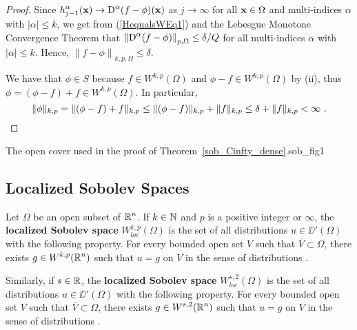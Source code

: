 \begin{proof}
Since
$\displaystyle
h^\alpha_{j-1}(\mathbf{x}) \to \operatorname{D}^\alpha (f-\phi)(\mathbf{x})$
as $j \to \infty$ for all $\mathbf{x} \in \Omega$ and multi-indices $\alpha$ with
$|\alpha| \leq k$, we get from (\ref{HequalsWEq1}) and the Lebesgue
Monotone Convergence Theorem that
$\displaystyle \left\| \operatorname{D}^\alpha (f - \phi)
\right\|_{p,\Omega} \leq \delta/Q$ for all multi-indices $\alpha$ with
$|\alpha| \leq k$.  Hence,
$\displaystyle \left\| f -\phi \right\|_{k,p,\Omega} \leq \delta$.

 We have that $\phi \in S$ because
$\displaystyle f\in W^{k,p}(\Omega)$
and $\displaystyle \phi-f \in W^{k,p}(\Omega)$ by (ii), thus
$\displaystyle \phi = (\phi-f) + f \in W^{k,p}(\Omega)$.
In particular,
\[
\|\phi \|_{k,p} = \| (\phi-f) + f \|_{k,p} \leq \| (\phi-f)\|_{k,p} +
\|f \|_{k,p} \leq \delta +\| f\|_{k,p} < \infty \ .  \qedhere
\]
\end{proof}

{The open cover used in the proof of Theorem~\ref{sob_Cinfty_dense}.}{sob_fig1}

\subsection{Localized Sobolev Spaces}

\begin{defn}
Let $\Omega$ be an open subset of $\displaystyle \mathbb{R}^n$.
If $k \in \mathbb{N}$ and $p$ is a positive integer or $\infty$, the
{\bfseries localized Sobolev space}
$\displaystyle W^{k,p}_{loc}(\Omega)$ is the set
of all distributions $u \in \DD'(\Omega)$ with the following property.
For every bounded open set $V$ such that $\overline{V}\subset \Omega$,
there exists $\displaystyle g\in W^{k,p}(\mathbb{R}^n)$ such that $u=g$ on
$V$ in the sense of distributions \footnotemark.\addtocounter{footnote}{-1}

Similarly, if $\displaystyle s \in \mathbb{R}$, the {\bfseries localized Sobolev space}
$\displaystyle W^{s,2}_{loc}(\Omega)$ is the set
of all distributions $u \in \DD'(\Omega)$ with the following property.
For every bounded open set $V$ such that $\overline{V}\subset \Omega$,
there exists $\displaystyle g\in W^{s,2}(\mathbb{R}^n)$ such that $u=g$ on
$V$ in the sense of distributions \footnotemark.
\end{defn}


